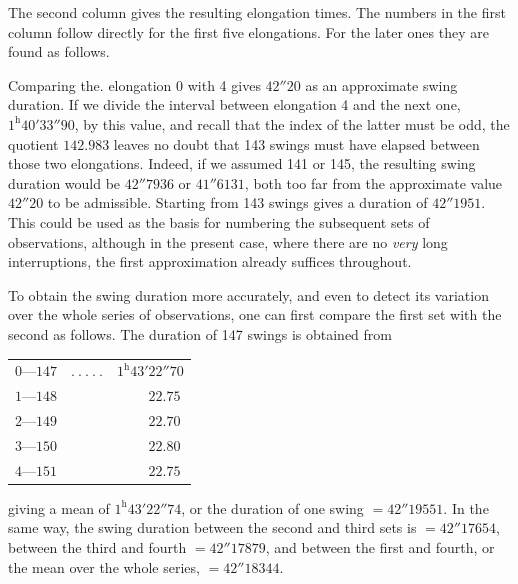 The second column gives the resulting elongation times. The numbers in the first column follow directly for the first five elongations. For the later ones they are found as follows.

Comparing the. elongation 0 with 4 gives $42''20$ as an approximate swing duration. If we divide the interval between elongation 4 and the next one, $1^{\mathrm{h}}40'33''90$, by this value, and recall that the index of the latter must be odd, the quotient $142.983$ leaves no doubt that 143 swings must have elapsed between those two elongations. Indeed, if we assumed 141 or 145, the resulting swing duration would be $42''7936$ or $41''6131$, both too far from the approximate value $42''20$ to be admissible. Starting from 143 swings gives a duration of $42''1951$. This could be used as the basis for numbering the subsequent sets of observations, although in the present case, where there are no \textit{very} long interruptions, the first approximation already suffices throughout.

To obtain the swing duration more accurately, and even to detect its variation over the whole series of observations, one can first compare the first set with the second as follows. The duration of 147 swings is obtained from
\begin{center}
\begin{tabular}{rcl}
$0\text{—}147$ & $.\ .\ .\ .\ .$ & $1^{\mathrm{h}}43'22''70$\\
$1\text{—}148$ & & $\phantom{1^{\mathrm{h}}43'}22.75$\\
$2\text{—}149$ & & $\phantom{1^{\mathrm{h}}43'}22.70$\\
$3\text{—}150$ & & $\phantom{1^{\mathrm{h}}43'}22.80$\\
$4\text{—}151$ & & $\phantom{1^{\mathrm{h}}43'}22.75$
\end{tabular}
\end{center}
giving a mean of $1^{\mathrm{h}}43'22''74$, or the duration of one swing $=42''19551$. In the same way, the swing duration between the second and third sets is $=42''17654$, between the third and fourth $=42''17879$, and between the first and fourth, or the mean over the whole series, $=42''18344$.

